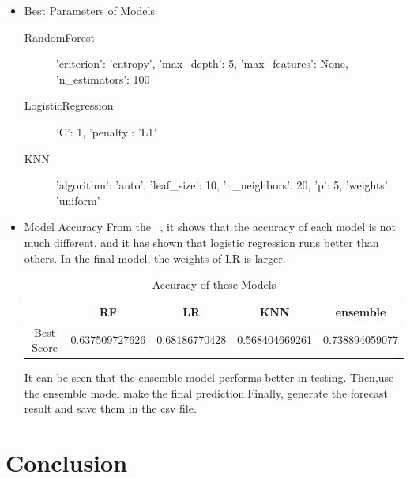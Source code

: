 \begin{itemize}
	\item Best Parameters of Models
	\begin{description}
		\item[RandomForest] 'criterion': 'entropy', 'max\_depth': 5, 
		'max\_features': None, 'n\_estimators': 100
		\item[LogisticRegression] 'C': 1, 'penalty': 'L1'

		\item[KNN] 'algorithm': 'auto', 'leaf\_size': 10, 
		'n\_neighbors': 20, 'p': 5, 'weights': 'uniform'

	\end{description}

	
\item Model Accuracy 
\newline
From the  ~,
it shows that the accuracy of 
each model is not much different.
and  it has shown that logistic regression runs better than others.
In the final model, the weights of LR is larger.

	\begin{table}[h]  
		\centering
		\caption{Accuracy of these Models}
		\label{tbl:best_score_base_models_old}
		\begin{tabular}{ccccc}
			\toprule
			& RF  & LR  & KNN & ensemble\\
			\midrule
			Best Score & 0.637509727626  & 0.68186770428  & 0.568404669261 & 0.738894059077\\
			\bottomrule
		\end{tabular}
	\end{table}
It can be seen that the ensemble model performs better in testing.
Then,use the ensemble model make the final prediction.Finally, generate the forecast result and save them in the csv file.
\end{itemize}
\newpage



\section{Conclusion}

